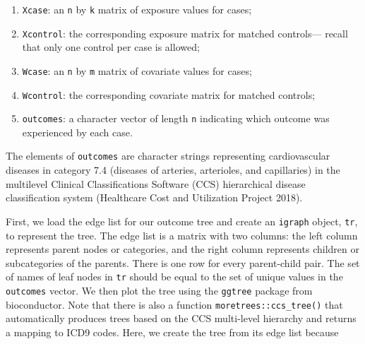 \documentclass[]{article}
\providecommand{\tightlist}{%
  \setlength{\itemsep}{0pt}\setlength{\parskip}{0pt}}
\begin{document}
\begin{enumerate}
\def\labelenumi{\arabic{enumi}.}
\tightlist
\item
  \texttt{Xcase}: an \texttt{n} by \texttt{k} matrix of exposure values
  for cases;
\item
  \texttt{Xcontrol}: the corresponding exposure matrix for matched
  controls--- recall that only one control per case is allowed;
\item
  \texttt{Wcase}: an \texttt{n} by \texttt{m} matrix of covariate values
  for cases;
\item
  \texttt{Wcontrol}: the corresponding covariate matrix for matched
  controls;
\item
  \texttt{outcomes}: a character vector of length \texttt{n} indicating
  which outcome was experienced by each case.
\end{enumerate}

The elements of \texttt{outcomes} are character strings representing
cardiovascular diseases in category 7.4 (diseases of arteries,
arterioles, and capillaries) in the multilevel Clinical Classifications
Software (CCS) hierarchical disease classification system (Healthcare
Cost and Utilization Project 2018).

First, we load the edge list for our outcome tree and create an
\texttt{igraph} object, \texttt{tr}, to represent the tree. The edge
list is a matrix with two columns: the left column represents parent
nodes or categories, and the right column represents children or
subcategories of the parents. There is one row for every parent-child
pair. The set of names of leaf nodes in \texttt{tr} should be equal to
the set of unique values in the \texttt{outcomes} vector. We then plot
the tree using the \texttt{ggtree} package from bioconductor. Note that
there is also a function \texttt{moretrees::ccs\_tree()} that
automatically produces trees based on the CCS multi-level hierarchy and
returns a mapping to ICD9 codes. Here, we create the tree from its edge
list because
\end{document}
